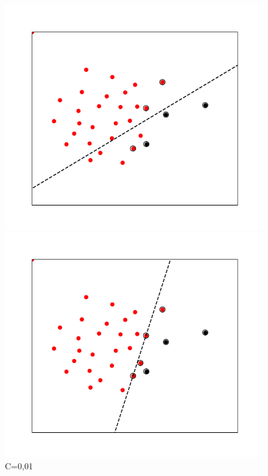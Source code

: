 \documentclass[11pt,a4paper]{article}
\begin{document}
\begin{figure}[H]
    \centering
    \begin{minipage}{0.24\textwidth}
        \centering
        \includegraphics[width=\textwidth]{images_plot/C001.png}
        \caption*{C=0,01}
    \end{minipage}
    \hfill
    \begin{minipage}{0.24\textwidth}
        \centering
        \includegraphics[width=\textwidth]{images_plot/C1.png}

\end{minipage}
\end{figure}
\end{document}
